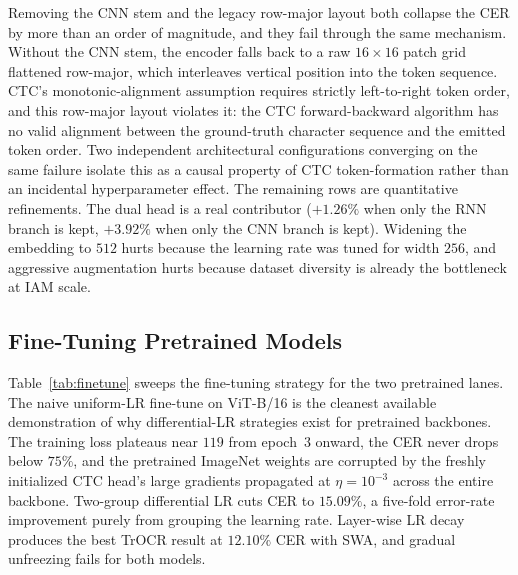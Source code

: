 Removing the CNN stem and the legacy row-major layout both collapse the CER by more than an order of magnitude, and they fail through the same mechanism. Without the CNN stem, the encoder falls back to a raw $16 \times 16$ patch grid flattened row-major, which interleaves vertical position into the token sequence. CTC's monotonic-alignment assumption requires strictly left-to-right token order, and this row-major layout violates it: the CTC forward-backward algorithm has no valid alignment between the ground-truth character sequence and the emitted token order. Two independent architectural configurations converging on the same failure isolate this as a causal property of CTC token-formation rather than an incidental hyperparameter effect. The remaining rows are quantitative refinements. The dual head is a real contributor ($+1.26\%$ when only the RNN branch is kept, $+3.92\%$ when only the CNN branch is kept). Widening the embedding to $512$ hurts because the learning rate was tuned for width $256$, and aggressive augmentation hurts because dataset diversity is already the bottleneck at IAM scale.

\subsection{Fine-Tuning Pretrained Models}
\label{sec:res_finetune}

Table~\ref{tab:finetune} sweeps the fine-tuning strategy for the two pretrained lanes. The naive uniform-LR fine-tune on ViT-B/16 is the cleanest available demonstration of why differential-LR strategies exist for pretrained backbones. The training loss plateaus near $119$ from epoch~$3$ onward, the CER never drops below $75\%$, and the pretrained ImageNet weights are corrupted by the freshly initialized CTC head's large gradients propagated at $\eta = 10^{-3}$ across the entire backbone. Two-group differential LR cuts CER to $15.09\%$, a five-fold error-rate improvement purely from grouping the learning rate. Layer-wise LR decay produces the best TrOCR result at $12.10\%$ CER with SWA, and gradual unfreezing fails for both models.

